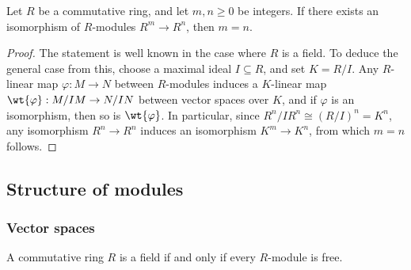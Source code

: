 \documentclass[12pt, a4paper]{article}
\begin{document}
\begin{proposition}
    Let \(R\) be a commutative ring, and let \(m,n\geq 0\) be integers. If there exists an isomorphism of \(R\)-modules \(R^m \to R^n\), then \(m=n\).
\end{proposition}

\begin{proof}
    The statement is well known in the case where \( R \) is a field. To deduce the general case from this, choose a maximal ideal \( I \subseteq R \), and set \( K = R/I \). Any \( R \)-linear map \( \varphi : M \rightarrow N \) between \( R \)-modules induces a \( K \)-linear map \( \wt{\varphi} : M/IM \rightarrow N/IN \) between vector spaces over \( K \), and if \( \varphi \) is an isomorphism, then so is \( \wt{\varphi} \). In particular, since \( R^n / IR^n \cong (R/I)^n = K^n \), any isomorphism \( R^n \rightarrow R^n \) induces an isomorphism \( K^m \rightarrow K^n \), from which \( m = n \) follows.
\end{proof}

\subsection{Structure of modules}

\subsubsection{Vector spaces}

\begin{mdthm}
    A commutative ring \(R\) is a field if and only if every \(R\)-module is free.
\end{mdthm}
\end{document}
